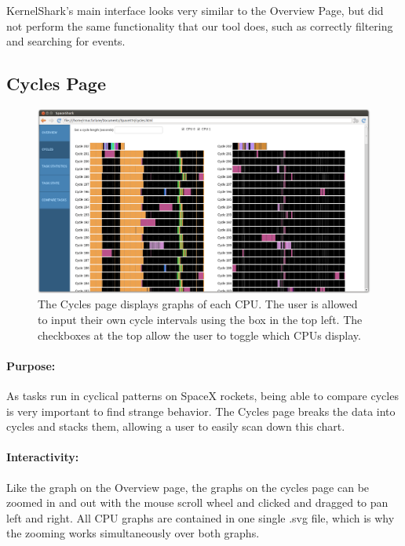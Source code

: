 \documentclass{hmcclinic}
\begin{document}
    KernelShark's main interface looks very similar to the Overview Page, but did not perform the same functionality that our tool does, such as correctly filtering and searching for events.

    
  \subsection{Cycles Page} %

  \begin{figure}[H]
  \centering
      \includegraphics[width=5in]{cycles-page.png}
  \caption{The Cycles page displays graphs of each CPU. The user is allowed to
  input their own cycle intervals using the box in the top left. The checkboxes
at the top allow the user to toggle which CPUs display.}
  \end{figure}
  
  \paragraph{Purpose:}As tasks run in cyclical patterns on SpaceX rockets, being able to compare
   cycles is very important to find strange behavior. The Cycles page
  breaks the data into cycles and stacks them, allowing a user to easily scan
  down this chart.

\paragraph{Interactivity:}    
    Like the graph on the Overview page, the graphs on the cycles page can be zoomed in and out with the mouse scroll wheel and clicked and dragged to pan left and right. All CPU graphs are contained in one single .svg file, which is why the zooming works simultaneously over both graphs.
\end{document}
